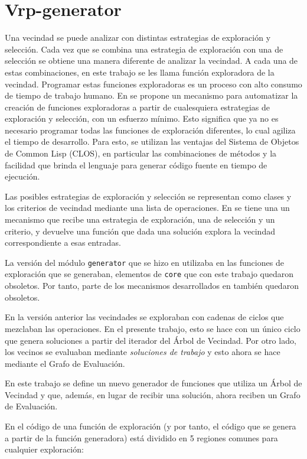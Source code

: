 \section{Vrp-generator}\label{2-blueprint}
Una vecindad se puede analizar con distintas estrategias de exploración y selección. Cada vez que se combina una estrategia de exploración con una de selección se obtiene una manera diferente de analizar la vecindad. A cada una de estas combinaciones, en este trabajo se les llama función exploradora de la vecindad. Programar estas funciones exploradoras es un proceso con alto consumo de tiempo de trabajo humano. En \cite{Heidy} se propone un mecanismo para automatizar la creación de funciones exploradoras a partir de cualesquiera estrategias de exploración y selección, con un esfuerzo mínimo. Esto significa que ya no es necesario programar todas las funciones de exploración diferentes, lo cual agiliza el tiempo de desarrollo. Para esto, se utilizan las ventajas del Sistema de Objetos de Common Lisp (CLOS), en particular las combinaciones de métodos y la facilidad que brinda el lenguaje para generar código fuente en tiempo de ejecución.

Las posibles estrategias de exploración y selección se representan como clases y los criterios de vecindad mediante una lista de operaciones. En \cite{Heidy} se tiene una un mecanismo que recibe una estrategia de exploración, una de selección y un criterio, y devuelve una función que dada una solución explora la vecindad correspondiente a esas entradas.

La versión del módulo \texttt{generator} que se hizo en \cite{Heidy} utilizaba en las funciones de exploración que se generaban, elementos de \texttt{core} que con este trabajo quedaron obsoletos. Por tanto, parte de los mecanismos desarrollados en \cite{Heidy} también quedaron obsoletos.

En la versión anterior las vecindades se exploraban con cadenas de ciclos que mezclaban las operaciones. En el presente trabajo, esto se hace con un único ciclo que genera soluciones a partir del iterador del Árbol de Vecindad. Por otro lado, los vecinos se evaluaban mediante \textit{soluciones de trabajo} y esto ahora se hace mediante el Grafo de Evaluación.

En este trabajo se define un nuevo generador de funciones que utiliza un Árbol de Vecindad y que, además, en lugar de recibir una solución, ahora reciben un Grafo de Evaluación.

En \cite{Heidy} el código de una función de exploración (y por tanto, el código que se genera a partir de la función generadora) está dividido en 5 regiones comunes para cualquier exploración:

